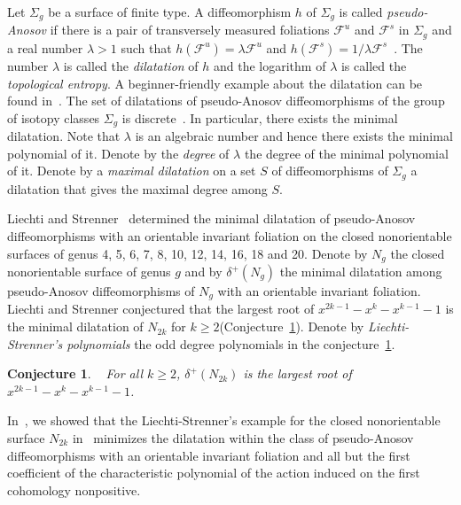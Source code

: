 \documentclass{amsart}
\newtheorem{con}[thm]{Conjecture}
\theoremstyle{definition}
\theoremstyle{remark}
\begin{document}
Let $\Sigma_g$ be a surface of finite type.
A diffeomorphism $h$ of $\Sigma_g$ is called \emph{pseudo-Anosov} if there is a pair of transversely measured foliations 
$\mathcal{F}^u$ and $\mathcal{F}^s$ in $\Sigma_g$ and a real number $\lambda >1$ such that $h(\mathcal{F}^u)=\lambda \mathcal{F}^u$ and  $h(\mathcal{F}^s)=1/\lambda \mathcal{F}^s$~\cite{Thurston88,CassonBleiler88}.
The number $\lambda$ is called the \emph{dilatation} of $h$ and the logarithm of $\lambda$ is called the \emph{topological entropy}. A beginner-friendly example about the dilatation can be found in~\cite{BaikRafiqiWu16}. The set of dilatations of pseudo-Anosov diffeomorphisms of the group of isotopy classes $\Sigma_g$ is discrete~\cite{ArnouxYoccoz81, Ivanov88}. In particular, there exists the minimal dilatation. Note that $\lambda$ is an algebraic number and hence there exists the minimal polynomial of it. Denote by the \emph{degree} of $\lambda$ the degree of the minimal polynomial of it. Denote by a \emph{maximal dilatation} on a set $S$ of diffeomorphisms of 
$\Sigma_g$ a dilatation that gives the maximal degree among $S$.


 Liechti and Strenner~\cite{LiechtiStrenner18} determined the minimal dilatation of pseudo-Anosov diffeomorphisms with an orientable invariant foliation on the closed nonorientable surfaces of genus 4, 5, 6, 7, 8, 10, 12, 14, 16, 18 and 20. 
 Denote by $N_g$ the closed nonorientable surface of genus $g$ and by 
$\delta^{+} (N_g)$ the minimal dilatation among pseudo-Anosov diffeomorphisms of $N_g$ with an orientable invariant foliation. Liechti and Strenner conjectured that the largest root of $x^{2k-1}-x^k-x^{k-1}-1$ is the minimal dilatation of $N_{2k}$ for $k \geq 2$(Conjecture~\ref{con:1}). Denote by \emph{Liechti-Strenner’s polynomials} the odd degree polynomials in the conjecture~\ref{con:1}.
 
\begin{con}~\cite[Conjecture 1.2]{LiechtiStrenner18} \label{con:1}
For all $k \geq 2$, $\delta^{+} (N_{2k})$ is the largest root of $x^{2k-1}-x^k-x^{k-1}-1$.
\end{con}

In~\cite{HamLee20}, we showed that the Liechti-Strenner's example for the closed nonorientable surface $N_{2k}$ in~\cite{LiechtiStrenner18} minimizes the dilatation within the class of pseudo-Anosov diffeomorphisms with an orientable invariant foliation and all but the first coefficient of the characteristic polynomial of the action induced on the first cohomology nonpositive. 
\end{document}

